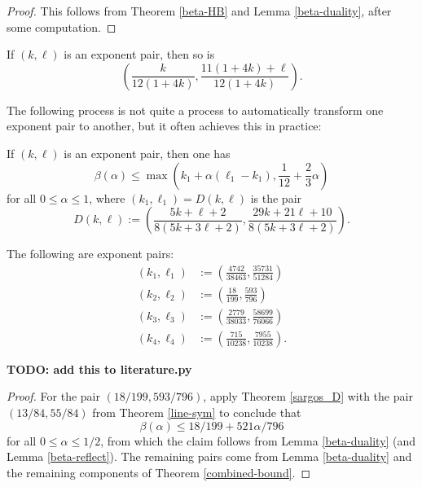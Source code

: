 \literature
{}

\begin{proof} This follows from Theorem \ref{beta-HB} and Lemma \ref{beta-duality}, after some computation.
\end{proof}


\begin{theorem}\label{sargos_C}\cite[Theorem 5]{sargos_analog_2003}  If $(k,\ell)$ is an exponent pair, then so is
    $$ \left(\frac{k}{12(1+4k)}, \frac{11(1+4k)+\ell}{12(1+4k)}\right).$$
\end{theorem}

\literature
{}

The following process is not quite a process to automatically transform one exponent pair to another, but it often achieves this in practice:

\begin{theorem}\label{sargos_D}\cite[Theorem 7.1]{sargos_points_1995}  If $(k,\ell)$ is an exponent pair, then one has
    $$ \beta(\alpha) \leq \max\left( k_1 + \alpha(\ell_1-k_1), \frac{1}{12} + \frac{2}{3} \alpha\right)$$
    for all $0 \leq \alpha \leq 1$, where $(k_1,\ell_1) = D(k,\ell)$ is the pair
$$ D(k,\ell) := \left(\frac{5k+\ell+2}{8(5k+3\ell+2)}, \frac{29k+21\ell+10}{8(5k+3\ell+2)}\right).$$
\end{theorem}

\literature
{}



\begin{theorem}\label{trudgian_yang_eps}\cite[Lemma 1.1]{trudgian-yang}  The following are exponent pairs:
\begin{align*}
 (k_1,\ell_1) &:= \left(\frac{4742}{38463}, \frac{35731}{51284}\right)\\
 (k_2,\ell_2) &:= \left(\frac{18}{199}, \frac{593}{796}\right)\\
 (k_3,\ell_3) &:= \left(\frac{2779}{38033}, \frac{58699}{76066}\right)\\
 (k_4,\ell_4) &:= \left(\frac{715}{10238}, \frac{7955}{10238}\right).
\end{align*}
\end{theorem}

{\bf TODO: add this to literature.py}

\begin{proof}  For the pair $(18/199, 593/796)$, apply Theorem \ref{sargos_D} with the pair $(13/84, 55/84)$ from Theorem \ref{line-sym} to conclude that
    $$ \beta(\alpha) \leq 18/199 + 521 \alpha / 796$$
    for all $0 \leq \alpha \leq 1/2$, from which the claim follows from Lemma \ref{beta-duality} (and Lemma \ref{beta-reflect}).
The remaining pairs come from Lemma \ref{beta-duality} and the remaining components of Theorem \ref{combined-bound}.
\end{proof}

